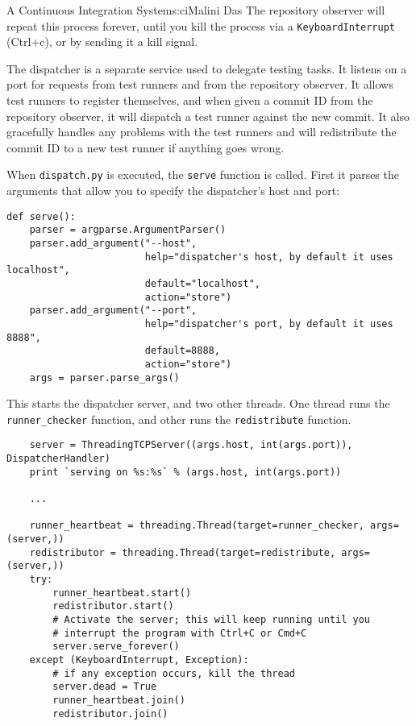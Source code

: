 \begin{aosachapter}{A Continuous Integration System}{s:ci}{Malini Das}
The repository observer will repeat this process forever, until you kill
the process via a \texttt{KeyboardInterrupt} (Ctrl+c), or by sending it
a kill signal.

\label{the-dispatcher-dispatcher.py}

The dispatcher is a separate service used to delegate testing tasks. It
listens on a port for requests from test runners and from the repository
observer. It allows test runners to register themselves, and when given
a commit ID from the repository observer, it will dispatch a test runner
against the new commit. It also gracefully handles any problems with the
test runners and will redistribute the commit ID to a new test runner if
anything goes wrong.

When \texttt{dispatch.py} is executed, the \texttt{serve} function is
called. First it parses the arguments that allow you to specify the
dispatcher's host and port:

\begin{verbatim}
def serve():
    parser = argparse.ArgumentParser()
    parser.add_argument("--host",
                        help="dispatcher's host, by default it uses localhost",
                        default="localhost",
                        action="store")
    parser.add_argument("--port",
                        help="dispatcher's port, by default it uses 8888",
                        default=8888,
                        action="store")
    args = parser.parse_args()
\end{verbatim}

This starts the dispatcher server, and two other threads. One thread
runs the \texttt{runner\_checker} function, and other runs the
\texttt{redistribute} function.

\begin{verbatim}
    server = ThreadingTCPServer((args.host, int(args.port)), DispatcherHandler)
    print `serving on %s:%s` % (args.host, int(args.port))

    ...

    runner_heartbeat = threading.Thread(target=runner_checker, args=(server,))
    redistributor = threading.Thread(target=redistribute, args=(server,))
    try:
        runner_heartbeat.start()
        redistributor.start()
        # Activate the server; this will keep running until you
        # interrupt the program with Ctrl+C or Cmd+C
        server.serve_forever()
    except (KeyboardInterrupt, Exception):
        # if any exception occurs, kill the thread
        server.dead = True
        runner_heartbeat.join()
        redistributor.join()
\end{verbatim}


\end{aosachapter}
